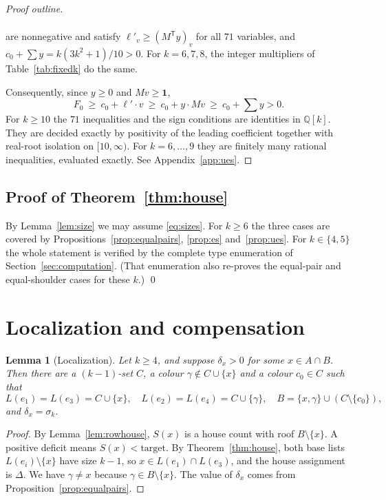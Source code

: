 \documentclass[11pt]{amsart}
\newtheorem{lemma}[theorem]{Lemma}
\theoremstyle{definition}
\theoremstyle{remark}
\newcommand{\1}{\mathbf 1}
\begin{document}
\begin{proof}[Proof outline]
\begin{enumerate}[label=(\arabic*)]
\[\begin{aligned}
\end{aligned}
\]
  are nonnegative and satisfy $\ell'_v\ge(M^{\mathsf T}y)_v$ for all $71$ variables, and
  $c_0+\sum y=k(3k^2+1)/10>0$. For $k=6,7,8$, the integer multipliers of Table~\ref{tab:fixedk} do
  the same.
\end{enumerate}
Consequently, since $y\ge0$ and $Mv\ge\1$,
\[
F_0\ \ge\ c_0+\ell'\!\cdot v\ \ge\ c_0+y\cdot Mv\ \ge\ c_0+\textstyle\sum y>0.
\]
For $k\ge10$ the $71$ inequalities and the sign conditions are identities in $\mathbb Q[k]$. They are
decided exactly by positivity of the leading coefficient together with real-root isolation on
$[10,\infty)$. For $k=6,\dots,9$ they are finitely many rational inequalities, evaluated exactly. See
Appendix~\ref{app:ues}.
\end{proof}

\subsection{Proof of Theorem~\ref{thm:house}}
By Lemma~\ref{lem:size} we may assume \eqref{eq:sizes}. For $k\ge6$ the three cases are covered by
Propositions~\ref{prop:equalpairs}, \ref{prop:es} and~\ref{prop:ues}. For $k\in\{4,5\}$ the whole
statement is verified by the complete type enumeration of Section~\ref{sec:computation}. (That
enumeration also re-proves the equal-pair and equal-shoulder cases for these $k$.) \qed

\section{Localization and compensation}\label{sec:pair}

\begin{lemma}[Localization]\label{lem:local}
Let $k\ge4$, and suppose $\delta_x>0$ for some $x\in A\cap B$. Then there are a $(k-1)$-set $C$, a colour
$\gamma\notin C\cup\{x\}$ and a colour $c_0\in C$ such that
\[
L(e_1)=L(e_3)=C\cup\{x\},\quad L(e_2)=L(e_4)=C\cup\{\gamma\},\quad B=\{x,\gamma\}\cup(C\setminus\{c_0\}),
\]
and $\delta_x=\sigma_k$.
\end{lemma}
\begin{proof}
By Lemma~\ref{lem:rowhouse}, $S(x)$ is a house count with roof $B\setminus\{x\}$. A positive deficit means
$S(x)<\mathrm{target}$. By Theorem~\ref{thm:house}, both base lists $L(e_i)\setminus\{x\}$ have size
$k-1$, so $x\in L(e_1)\cap L(e_3)$, and the house assignment is $\Delta$. We have $\gamma\ne x$ because
$\gamma\in B\setminus\{x\}$. The value of $\delta_x$ comes from Proposition~\ref{prop:equalpairs}.
\end{proof}
\end{document}
